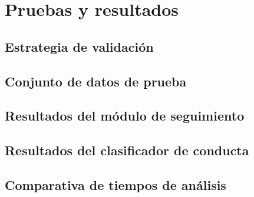 \chapter{Pruebas y resultados}

\section{Estrategia de validaci\'{o}n}

\section{Conjunto de datos de prueba}

\section{Resultados del m\'{o}dulo de seguimiento}

\section{Resultados del clasificador de conducta}

\section{Comparativa de tiempos de an\'{a}lisis}
